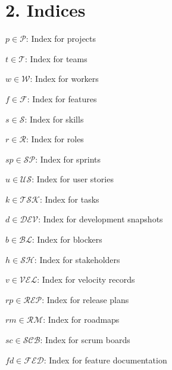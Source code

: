 \documentclass[12pt]{article}
\begin{document}
\section{2. Indices}
\item $p \in \mathcal{P}$: Index for projects
    \item $t \in \mathcal{T}$: Index for teams
    \item $w \in \mathcal{W}$: Index for workers
    \item $f \in \mathcal{F}$: Index for features
    \item $s \in \mathcal{S}$: Index for skills
    \item $r \in \mathcal{R}$: Index for roles
    \item $sp \in \mathcal{SP}$: Index for sprints
    \item $u \in \mathcal{US}$: Index for user stories
    \item $k \in \mathcal{TSK}$: Index for tasks
    \item $d \in \mathcal{DEV}$: Index for development snapshots
    \item $b \in \mathcal{BL}$: Index for blockers
    \item $h \in \mathcal{SH}$: Index for stakeholders
    \item $v \in \mathcal{VEL}$: Index for velocity records
    \item $rp \in \mathcal{REP}$: Index for release plans
    \item $rm \in \mathcal{RM}$: Index for roadmaps
    \item $sc \in \mathcal{SCB}$: Index for scrum boards
    \item $fd \in \mathcal{FED}$: Index for feature documentation
\end{document}
